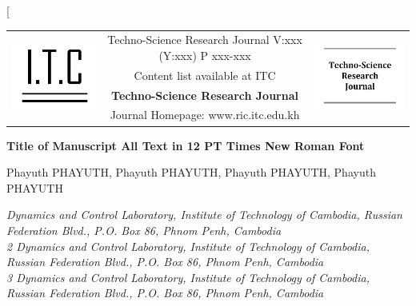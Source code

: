 \documentclass[10pt,letterpaper,twocolumn]{article}
\begin{document}
\twocolumn[  
\begin{@twocolumnfalse}

%	
%
%
	
	{\renewcommand{\arraystretch}{2}
		\begin{tabular}{lcr}
			\multirow{4}{*}{\includegraphics[width=0.2\linewidth]{logo1.PNG}} & Techno-Science Research Journal V:xxx (Y:xxx) P xxx-xxx  & \multirow{4}{*}{\includegraphics[width=0.2\linewidth]{logo2.PNG}} \\
			& Content list available at ITC &                      \\
			& \LARGE
			\textbf{Techno-Science Research Journal} &                      \\
			& Journal Homepage: www.ric.itc.edu.kh  &                     
		\end{tabular}
	}
	
	\begin{center}
	\large
	\textbf{Title of Manuscript All Text in 12 PT Times New Roman Font}
	\end{center}

	\begin{center}
	Phayuth PHAYUTH\footnotemark, Phayuth PHAYUTH, Phayuth PHAYUTH, Phayuth PHAYUTH
	\end{center}

	\begin{center}
	\textit{
	Dynamics and Control Laboratory, Institute of Technology of Cambodia, Russian Federation Blvd., P.O. Box 86, Phnom Penh, Cambodia\\
	2 Dynamics and Control Laboratory, Institute of Technology of Cambodia, Russian Federation Blvd., P.O. Box 86, Phnom Penh, Cambodia\\
	3 Dynamics and Control Laboratory, Institute of Technology of Cambodia, Russian Federation Blvd., P.O. Box 86, Phnom Penh, Cambodia
	}
	\end{center}


\end{@twocolumnfalse}
\end{document}
